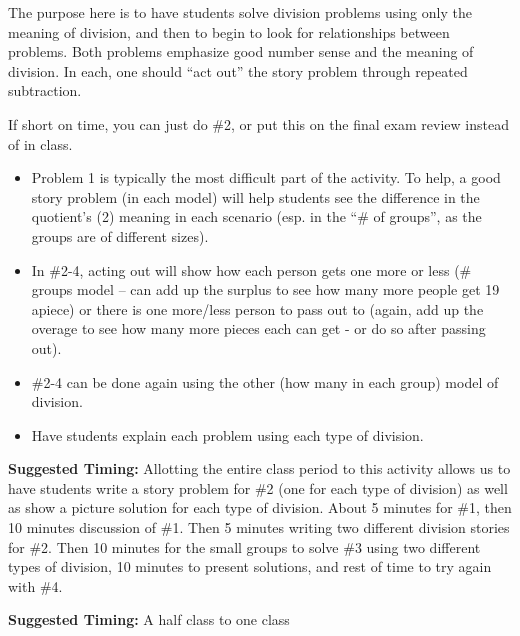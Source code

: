 \documentclass[nooutcomes,noauthor,handout]{ximera}
\begin{document}
\begin{instructorNotes}
The purpose here is to have students solve division problems using only the meaning of division, and then to begin to look for relationships between problems. Both problems emphasize good number sense and the meaning of division.  In each, one should ``act out'' the story problem through repeated subtraction.

If short on time, you can just do \#2, or put this on the final exam review instead of in class.

\begin{itemize}
    \item Problem 1 is typically the most difficult part of the activity.  To help, a good story problem (in each model) will help students see the difference in the quotient's (2) meaning in each scenario (esp. in the ``\# of groups'', as the groups are of different sizes). \item In \#2-4, acting out will show how each person gets one more or less (\# groups model -- can add up the surplus to see how many more people get 19 apiece) or there is one more/less person to pass out to (again, add up the overage to see how many more pieces each can get - or do so after passing out).  
	\item \#2-4 can be done again using the other (how many in each group) model of division.
	\item Have students explain each problem using each type of division.  
\end{itemize}

{\bf Suggested Timing:} Allotting the entire class period to this activity allows us to have students write a story problem for \#2 (one for each type of division) as well as show a picture solution for each type of division.  About 5 minutes for \#1, then 10 minutes discussion of \#1.  Then 5 minutes writing two different division stories for \#2.  Then 10 minutes for the small groups to solve \#3 using two different types of division, 10 minutes to present solutions, and rest of time to try again with \#4. 



{\bf Suggested Timing:}  A half class to one class

\end{instructorNotes}
\end{document}
